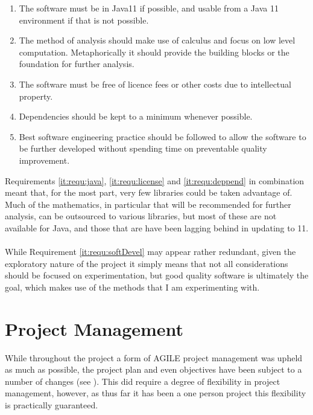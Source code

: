 \documentclass[main.tex]{subfiles}
\begin{document}
    \begin{enumerate}
      \item \label{it:requ:java} The software must be in Java11 if possible, and usable from a Java 11 environment if that is not possible.
      \item \label{it:requ:calculus} The method of analysis should make use of calculus and focus on low level computation. Metaphorically it should provide the building blocks or the foundation for further analysis.
      \item \label{it:requ:license} The software must be free of licence fees or other costs due to intellectual property.
      \item \label{it:requ:deppend} Dependencies should be kept to a minimum whenever possible.
      \item \label{it:requ:softDevel} Best software engineering practice should be followed to allow the software to be further developed without spending time on preventable quality improvement.        
    \end{enumerate}
    
    Requirements \ref{it:requ:java}, \ref{it:requ:license} and \ref{it:requ:deppend} in combination meant that, for the most part, very few  libraries could be taken advantage of. Much of the mathematics, in particular that will be recommended for further analysis, can be outsourced to various libraries, but most of these are not available for Java, and those that are have been lagging behind in updating to 11. 
    \\\\
    While Requirement \ref{it:requ:softDevel} may appear rather redundant, given the exploratory nature of the project it simply means that not all considerations should be focused on experimentation, but good quality software is ultimately the goal, which makes use of the methods that I am experimenting with.
    
  \section{Project Management}
  
    While throughout the project a form of AGILE project management was upheld as much as possible, the project plan and even objectives have been subject to a number of changes (see ). This did require a degree of flexibility in project management, however, as thus far it has been a one person project this flexibility is practically guaranteed.
    
\end{document}
